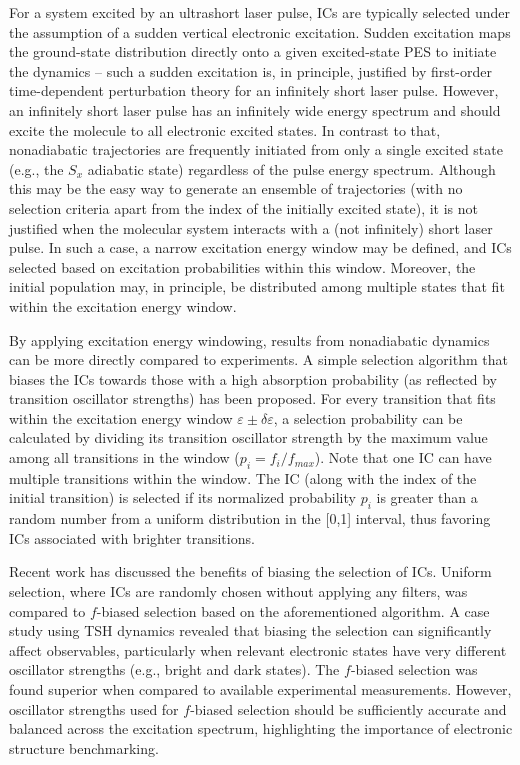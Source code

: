 \documentclass[9pt,bestpractices,pubversion]{livecoms}
\begin{document}
For a system excited by an ultrashort laser pulse, ICs are typically selected under the assumption of a sudden vertical electronic excitation. Sudden excitation maps the ground-state distribution directly onto a given excited-state PES to initiate the dynamics -- such a sudden excitation is, in principle, justified by first-order time-dependent perturbation theory for an infinitely short laser pulse.\cite{tannor_book} However, an infinitely short laser pulse has an infinitely wide energy spectrum and should excite the molecule to all electronic excited states. In contrast to that, nonadiabatic trajectories are frequently initiated from only a single excited state (e.g., the $S_x$ adiabatic state) regardless of the pulse energy spectrum. Although this may be the easy way to generate an ensemble of trajectories (with no selection criteria apart from the index of the initially excited state), it is not justified when the molecular system interacts with a (not infinitely) short laser pulse. In such a case, a narrow excitation energy window may be defined, and ICs selected based on excitation probabilities within this window. Moreover, the initial population may, in principle, be distributed among multiple states that fit within the excitation energy window.

By applying excitation energy windowing, results from nonadiabatic dynamics can be more directly compared to experiments. A simple selection algorithm that biases the ICs towards those with a high absorption probability (as reflected by transition oscillator strengths) has been proposed.\cite{barbatti2010non, barbatti2022newton} For every transition that fits within the excitation energy window $\varepsilon \pm \delta \varepsilon$, a selection probability can be calculated by dividing its transition oscillator strength by the maximum value among all transitions in the window ($p_i = f_i / f_{max}$). Note that one IC can have multiple transitions within the window. The IC (along with the index of the initial transition) is selected if its normalized probability $p_i$ is greater than a random number from a uniform distribution in the [0,1] interval, thus favoring ICs associated with brighter transitions.

Recent work has discussed the benefits of biasing the selection of ICs.\cite{prlj2023deciphering} Uniform selection, where ICs are randomly chosen without applying any filters, was compared to $f$-biased selection based on the aforementioned algorithm. A case study using TSH dynamics revealed that biasing the selection can significantly affect observables, particularly when relevant electronic states have very different oscillator strengths (e.g., bright and dark states). The $f$-biased selection was found superior when compared to available experimental measurements. However, oscillator strengths used for $f$-biased selection should be sufficiently accurate and balanced across the excitation spectrum, highlighting the importance of electronic structure benchmarking.
\end{document}
